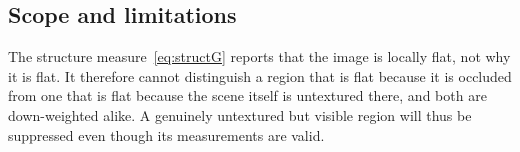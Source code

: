%
%
%
%
%

\subsection{Scope and limitations}
\label{sec:hermite-weight-limitation}

The structure measure~\eqref{eq:structG} reports that the image is locally
flat, not why it is flat. It therefore cannot distinguish a region that is
flat because it is occluded from one that is flat because the scene itself is
untextured there, and both are down-weighted alike. A genuinely untextured but
visible region will thus be suppressed even though its measurements are valid.

